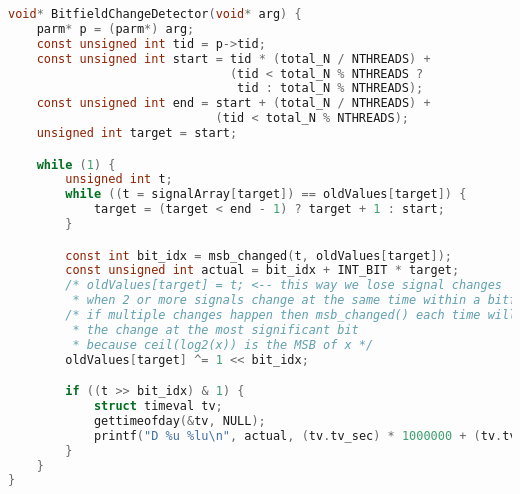\begin{lstlisting}[language=c, caption={BitfieldChangeDetector()}, escapechar=$]
void* BitfieldChangeDetector(void* arg) {
    parm* p = (parm*) arg;
    const unsigned int tid = p->tid;
    const unsigned int start = tid * (total_N / NTHREADS) +
                               (tid < total_N % NTHREADS ?
                                tid : total_N % NTHREADS);
    const unsigned int end = start + (total_N / NTHREADS) +
                             (tid < total_N % NTHREADS);
    unsigned int target = start;

    while (1) {
        unsigned int t;
        while ((t = signalArray[target]) == oldValues[target]) {
            target = (target < end - 1) ? target + 1 : start;
        }

        const int bit_idx = msb_changed(t, oldValues[target]);
        const unsigned int actual = bit_idx + INT_BIT * target;
        /* oldValues[target] = t; <-- this way we lose signal changes
         * when 2 or more signals change at the same time within a bitfield. */
        /* if multiple changes happen then msb_changed() each time will find
         * the change at the most significant bit
         * because ceil(log2(x)) is the MSB of x */
        oldValues[target] ^= 1 << bit_idx;

        if ((t >> bit_idx) & 1) {
            struct timeval tv;
            gettimeofday(&tv, NULL);
            printf("D %u %lu\n", actual, (tv.tv_sec) * 1000000 + (tv.tv_usec));
        }
    }
}
\end{lstlisting}

